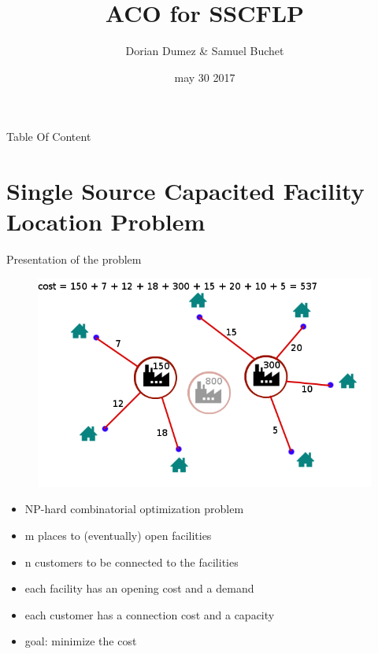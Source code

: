 \documentclass{beamer}
\title{ACO for SSCFLP}
\author{Dorian Dumez \& Samuel Buchet}
\date{may 30 2017}
\begin{document}
\begin{frame}
  \titlepage
\end{frame}

\begin{frame}{Table Of Content}
  \tableofcontents
\end{frame}

\section{Single Source Capacited Facility Location Problem}

\begin{frame}{Presentation of the problem}

    \begin{figure}
        \centering
        \includegraphics[scale=0.3]{schema}
    \end{figure}

    \begin{itemize}
        \item NP-hard combinatorial optimization problem
        \item m places to (eventually) open facilities
        \item n customers to be connected to the facilities
        \item each facility has an opening cost and a demand
        \item each customer has a connection cost and a capacity
        \item goal: minimize the cost
    \end{itemize}

\end{frame}
\end{document}
